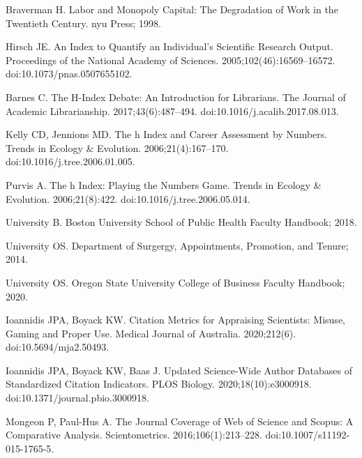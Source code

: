 \documentclass[
  10pt,
  letterpaper,
]{article}
\begin{document}
\begin{thebibliography}{10}
Braverman H.
\newblock Labor and Monopoly Capital: {{The}} Degradation of Work in the Twentieth Century.
\newblock nyu Press; 1998.

Hirsch JE.
\newblock An Index to Quantify an Individual's Scientific Research Output.
\newblock Proceedings of the National Academy of Sciences. 2005;102(46):16569--16572.
\newblock doi:{10.1073/pnas.0507655102}.

Barnes C.
\newblock The H-Index {{Debate}}: {{An Introduction}} for {{Librarians}}.
\newblock The Journal of Academic Librarianship. 2017;43(6):487--494.
\newblock doi:{10.1016/j.acalib.2017.08.013}.

Kelly CD, Jennions MD.
\newblock The h Index and Career Assessment by Numbers.
\newblock Trends in Ecology \& Evolution. 2006;21(4):167--170.
\newblock doi:{10.1016/j.tree.2006.01.005}.

Purvis A.
\newblock The h Index: Playing the Numbers Game.
\newblock Trends in Ecology \& Evolution. 2006;21(8):422.
\newblock doi:{10.1016/j.tree.2006.05.014}.

University B.
\newblock Boston {{University School}} of {{Public Health Faculty Handbook}}; 2018.

University OS.
\newblock Department of {{Surgergy}}, {{Appointments}}, {{Promotion}}, and {{Tenure}}; 2014.

University OS.
\newblock Oregon {{State University College}} of {{Business Faculty Handbook}}; 2020.

Ioannidis JPA, Boyack KW.
\newblock Citation Metrics for Appraising Scientists: Misuse, Gaming and Proper Use.
\newblock Medical Journal of Australia. 2020;212(6).
\newblock doi:{10.5694/mja2.50493}.

Ioannidis JPA, Boyack KW, Baas J.
\newblock Updated Science-Wide Author Databases of Standardized Citation Indicators.
\newblock PLOS Biology. 2020;18(10):e3000918.
\newblock doi:{10.1371/journal.pbio.3000918}.

Mongeon P, {Paul-Hus} A.
\newblock The Journal Coverage of {{Web}} of {{Science}} and {{Scopus}}: A Comparative Analysis.
\newblock Scientometrics. 2016;106(1):213--228.
\newblock doi:{10.1007/s11192-015-1765-5}.


\end{thebibliography}
\end{document}
